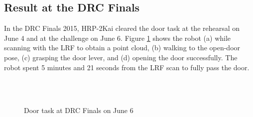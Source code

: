 \subsection{Result at the DRC Finals}
%
In the DRC Finals 2015, HRP-2Kai cleared the door task at the rehearsal on June 4 and at the challenge on June 6.
Figure \ref{fig:drc_door_aist_day2} shows the robot (a) while scanning with the LRF to
obtain a point cloud, (b) walking to the open-door pose, (c) grasping the door lever,
and (d) opening the door successfully.
The robot spent 5 minutes and 21 seconds from the LRF scan to fully pass the door.
%
\begin{figure}[t]
	\centering
	\quad
	\\
	\quad
	\\
	\caption{Door task at DRC Finals on June 6~\cite{DARPA}}
	\label{fig:drc_door_aist_day2}
\end{figure}

